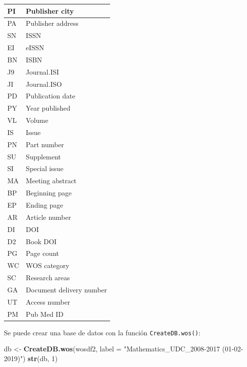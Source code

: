 \documentclass[
]{book}
\newenvironment{Shaded}{\begin{snugshade}}{\end{snugshade}}
\newcommand{\AttributeTok}[1]{\textcolor[rgb]{0.13,0.29,0.53}{#1}}
\newcommand{\DecValTok}[1]{\textcolor[rgb]{0.00,0.00,0.81}{#1}}
\newcommand{\FunctionTok}[1]{\textcolor[rgb]{0.13,0.29,0.53}{\textbf{#1}}}
\newcommand{\NormalTok}[1]{#1}
\newcommand{\OtherTok}[1]{\textcolor[rgb]{0.56,0.35,0.01}{#1}}
\newcommand{\StringTok}[1]{\textcolor[rgb]{0.31,0.60,0.02}{#1}}
\begin{document}
\begin{tabular}{l|l}
\hline
PI & Publisher city\\
\hline
PA & Publisher address\\
\hline
SN & ISSN\\
\hline
EI & eISSN\\
\hline
BN & ISBN\\
\hline
J9 & Journal.ISI\\
\hline
JI & Journal.ISO\\
\hline
PD & Publication date\\
\hline
PY & Year published\\
\hline
VL & Volume\\
\hline
IS & Issue\\
\hline
PN & Part number\\
\hline
SU & Supplement\\
\hline
SI & Special issue\\
\hline
MA & Meeting abstract\\
\hline
BP & Beginning page\\
\hline
EP & Ending page\\
\hline
AR & Article number\\
\hline
DI & DOI\\
\hline
D2 & Book DOI\\
\hline
PG & Page count\\
\hline
WC & WOS category\\
\hline
SC & Research areas\\
\hline
GA & Document delivery number\\
\hline
UT & Access number\\
\hline
PM & Pub Med ID\\
\hline
\end{tabular}

Se puede crear una base de datos con la función \texttt{CreateDB.wos()}:

\begin{Shaded}
\begin{Highlighting}[]
\NormalTok{db }\OtherTok{\textless{}{-}} \FunctionTok{CreateDB.wos}\NormalTok{(wosdf2, }\AttributeTok{label =} \StringTok{"Mathematics\_UDC\_2008{-}2017 (01{-}02{-}2019)"}\NormalTok{)}
\FunctionTok{str}\NormalTok{(db, }\DecValTok{1}\NormalTok{)}
\end{Highlighting}
\end{Shaded}
\end{document}
